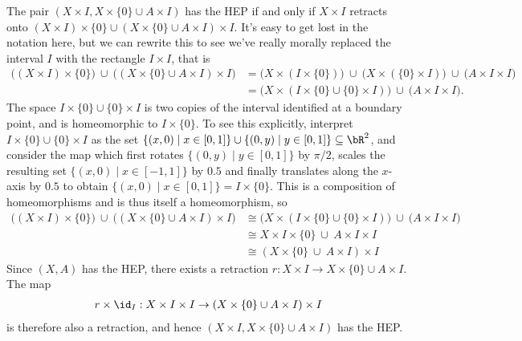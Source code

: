 \begin{homework}[e]
\begin{prf}
		The pair $(X\times I, X\times \{0\}\cup A\times I)$ has the HEP if and only if $X\times I$ retracts onto $(X\times I) \times \{0\} \cup (X\times \{0\}\cup A\times I)\times I$. It's easy to get lost in the notation here, but we can rewrite this to see we've really morally replaced the interval $I$ with the rectangle $I\times I$, that is
		\begin{align*}
			\big( (X\times I) \times \{0\} \big) ~\cup~ \big((X\times \{0\}\cup A\times I)\times I \big)
			&= \big( X\times (I \times \{0\}) \big) ~\cup~ \big(X \times (\{0\} \times I)\big) ~\cup~ \big(A\times I \times I\big) \\
			&= \big(X\times (I\times \{0\} \cup \{0\}\times I) \big) ~\cup~ \big(A\times I\times I\big).
		\end{align*}
		The space $I\times \{0\} \cup \{0\}\times I$ is two copies of the interval identified at a boundary point, and is homeomorphic to $I\times \{0\}$. To see this explicitly, interpret $I\times \{0\} \cup \{0\}\times I$ as the set $\{(x,0) \mid x \in [0,1]\}\cup \{(0,y)\mid y \in [0,1]\} \subseteq \bR^2$, and consider the map which first rotates $\{(0,y)\mid y \in [0,1]\}$ by $\pi/2$, scales the resulting set $\{(x,0) \mid x \in [-1,1]\}$ by $0.5$ and finally translates along the $x$-axis by $0.5$ to obtain $\{(x,0)\mid x \in [0,1]\} = I \times \{0\}$. This is a composition of homeomorphisms and is thus itself a homeomorphism, so 
		\begin{align*}
			\big( (X\times I) \times \{0\} \big) ~\cup~ \big((X\times \{0\}\cup A\times I)\times I \big) 
			&\cong\big(X\times (I\times \{0\} \cup \{0\}\times I) \big) ~\cup~ \big(A\times I\times I\big) \\
			&\cong X\times I \times \{0\} ~\cup ~ A\times I \times I \\
			&\cong (X\times \{0\} ~\cup ~ A\times I) \times I
		\end{align*}
		Since $(X,A)$ has the HEP, there exists a retraction $r:X\times I \to X\times \{0\} \cup A\times I$. The map
		\begin{align*}
			r\times \id_I:X\times I \times I \to (X\times \{0\} \cup A\times I)\times I
		\end{align*}
		is therefore also a retraction, and hence $(X\times I, X\times \{0\}\cup A\times I)$ has the HEP.

		\bigskip


\end{prf}
\end{homework}
